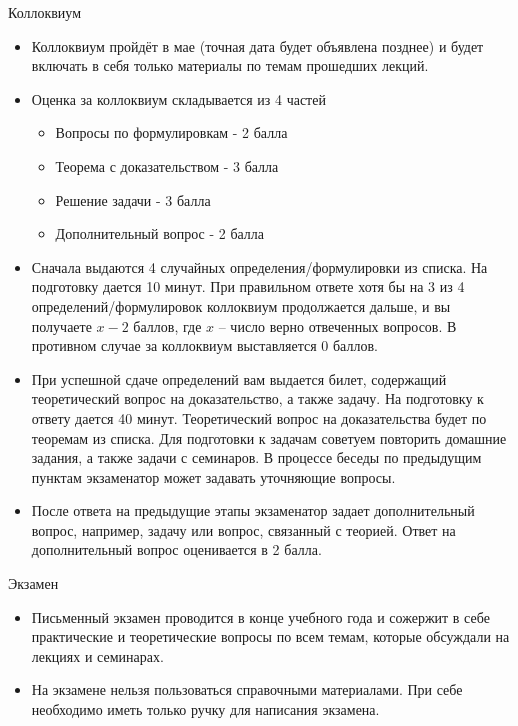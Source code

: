 \documentclass[9pt, aspectratio=169]{beamer}
\begin{document}
\begin{frame}{Коллоквиум}
    \begin{itemize}
        \item Коллоквиум пройдёт в мае (точная дата будет объявлена позднее) и будет включать в себя только материалы по темам прошедших лекций.
        \item Оценка за коллоквиум складывается из 4 частей
        \begin{itemize}
            \item Вопросы по формулировкам - 2 балла
            \item Теорема с доказательством - 3 балла
            \item Решение задачи - 3 балла
            \item Дополнительный вопрос - 2 балла
        \end{itemize}
        \item Сначала выдаются 4 случайных определения/формулировки из списка. На подготовку дается 10 минут. При правильном ответе хотя бы на 3 из 4 определений/формулировок коллоквиум продолжается дальше, и вы получаете $x-2$ баллов, где $x$ – число верно отвеченных вопросов. В противном случае за коллоквиум выставляется 0 баллов.
        \item При успешной сдаче определений вам выдается билет, содержащий теоретический вопрос на доказательство, а также задачу. На подготовку к ответу дается 40 минут. Теоретический вопрос на доказательства будет по теоремам из списка. Для подготовки к задачам советуем повторить домашние задания, а также задачи с семинаров.
        В процессе беседы по предыдущим пунктам экзаменатор может задавать уточняющие вопросы. 
        \item После ответа на предыдущие этапы экзаменатор задает дополнительный вопрос, например, задачу или вопрос, связанный с теорией. Ответ на дополнительный вопрос оценивается в 2 балла.
    \end{itemize}
\end{frame}

\begin{frame}{Экзамен}
    \begin{itemize}
        \item Письменный экзамен проводится в конце учебного года и сожержит в себе практические и теоретические вопросы по всем темам, которые обсуждали на лекциях и семинарах.
        \item На экзамене нельзя пользоваться справочными материалами. При себе необходимо иметь только ручку для написания экзамена.
    \end{itemize}
\end{frame}
\end{document}
